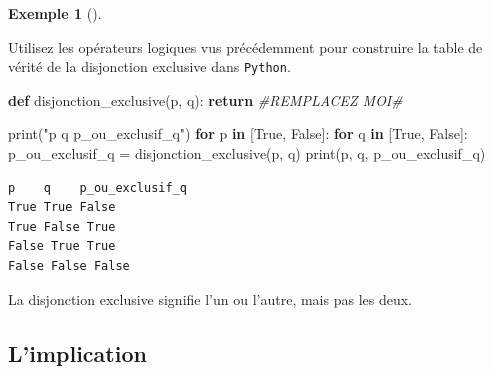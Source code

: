 \documentclass[
  letterpaper,
]{scrbook}
\newenvironment{Shaded}{}{}
\newcommand{\BuiltInTok}[1]{#1}
\newcommand{\CommentTok}[1]{\textcolor[rgb]{0.38,0.63,0.69}{\textit{#1}}}
\newcommand{\ControlFlowTok}[1]{\textcolor[rgb]{0.00,0.44,0.13}{\textbf{#1}}}
\newcommand{\KeywordTok}[1]{\textcolor[rgb]{0.00,0.44,0.13}{\textbf{#1}}}
\newcommand{\NormalTok}[1]{#1}
\newcommand{\OperatorTok}[1]{\textcolor[rgb]{0.40,0.40,0.40}{#1}}
\newcommand{\StringTok}[1]{\textcolor[rgb]{0.25,0.44,0.63}{#1}}
\newcommand{\VariableTok}[1]{\textcolor[rgb]{0.10,0.09,0.49}{#1}}
\theoremstyle{plain}
\theoremstyle{definition}
\newtheorem{example}{Exemple}[chapter]
\theoremstyle{definition}
\theoremstyle{remark}
\begin{document}
\leavevmode{}%
\begin{example}[]\label{exm-disjonction-exclusive-python}

Utilisez les opérateurs logiques vus précédemment pour construire la
table de vérité de la disjonction exclusive dans \texttt{Python}.

\hypertarget{disjonction-exclusive-python-todo}{}
\begin{Shaded}
\begin{Highlighting}[]
\KeywordTok{def}\NormalTok{ disjonction\_exclusive(p, q):}
    \ControlFlowTok{return} \CommentTok{\#REMPLACEZ MOI\#}

\BuiltInTok{print}\NormalTok{(}\StringTok{"p    q    p\_ou\_exclusif\_q"}\NormalTok{)}
\ControlFlowTok{for}\NormalTok{ p }\KeywordTok{in}\NormalTok{ [}\VariableTok{True}\NormalTok{, }\VariableTok{False}\NormalTok{]:}
    \ControlFlowTok{for}\NormalTok{ q }\KeywordTok{in}\NormalTok{ [}\VariableTok{True}\NormalTok{, }\VariableTok{False}\NormalTok{]:}
\NormalTok{        p\_ou\_exclusif\_q }\OperatorTok{=}\NormalTok{ disjonction\_exclusive(p, q)}
        \BuiltInTok{print}\NormalTok{(p, q, p\_ou\_exclusif\_q)}
\end{Highlighting}
\end{Shaded}

\hypertarget{disjonction-exclusive-python}{}
\begin{verbatim}
p    q    p_ou_exclusif_q
True True False
True False True
False True True
False False False
\end{verbatim}

\end{example}

\begin{tcolorbox}[enhanced jigsaw, opacityback=0, rightrule=.15mm, breakable, toprule=.15mm, colbacktitle=quarto-callout-important-color!10!white, title=\textcolor{quarto-callout-important-color}{\faExclamation}\hspace{0.5em}{Important}, titlerule=0mm, arc=.35mm, colback=white, coltitle=black, colframe=quarto-callout-important-color-frame, bottomtitle=1mm, toptitle=1mm, bottomrule=.15mm, leftrule=.75mm, left=2mm, opacitybacktitle=0.6]

La disjonction exclusive signifie l'un ou l'autre, mais pas les deux.

\end{tcolorbox}

\hypertarget{limplication}{%
\subsection{L'implication}\label{limplication}}
\end{document}
